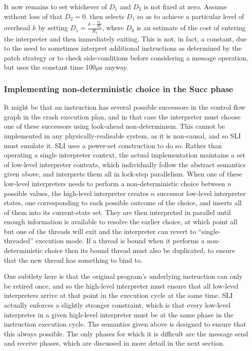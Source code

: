 
It now remains to set whichever of $D_1$ and $D_2$ is not fixed at
zero.  Assume without loss of that $D_2 = 0$.  {\Implementation} then
selects $D_1$ so as to achieve a particular level of overhead $k$ by
setting $D_1 = \frac{k - \frac{D_0}{R_2}}{R_1}$, where $D_0$ is an
estimate of the cost of entering the interpreter and then immediately
exiting.  This is not, in fact, a constant, due to the need to
sometimes interpret additional instructions as determined by the patch
strategy or to check side-conditions before considering a message
operation, but {\implementation} uses the constant time 100$\mu$s
anyway.

\subsubsection{Implementing non-deterministic choice in the Succ phase}

It might be that an instruction has several possible successors in the
control flow graph in the crash execution plan, and in that case the
interpreter must choose one of these successors using look-ahead
non-determinism.  This cannot be implemented in any
physically-realisable system, as it is non-causal, and so SLI must
emulate it.  SLI uses a power-set construction to do so.  Rather than
operating a single interpreter context, the actual implementation
maintains a set of low-level interpreter contexts, which individually
follow the abstract semantics given above, and interprets them all in
lock-step parallelism.  When one of these low-level interpreters needs
to perform a non-deterministic choice between $n$ possible values, the
high-level interpreter creates $n$ successor low-level interpreter
states, one corresponding to each possible outcome of the choice, and
inserts all of them into its current-state set.  They are then
interpreted in parallel until enough information is available to
resolve the earlier choice, at which point all but one of the threads
will exit and the interpreter can revert to ``single-threaded''
execution mode.  If a thread is bound when it performs a
non-deterministic choice then its bound thread must also be
duplicated, to ensure that the new thread has something to bind
to.

One subtlety here is that the original program's underlying
instruction can only be retired once, and so the high-level
interpreter must ensure that all low-level interpreters arrive at that
point in the execution cycle at the same time.  SLI actually enforces
a slightly stronger constraint, which is that every low-level
interpreter in a given high-level interpreter must be at the same
phase in the instruction execution cycle.  The semantics given above
is designed to ensure that this always possible.  The only phases for
which it is difficult are the message send and receive phases, which
are discussed in more detail in the next section.


